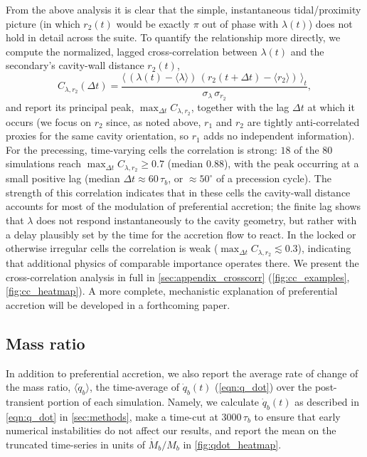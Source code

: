 \documentclass[fleqn,usenatbib]{mnras}
\begin{document}
From the above analysis it is clear that the simple, instantaneous tidal/proximity picture (in which $r_2(t)$ would be exactly $\pi$ out of phase with $\lambda(t)$) does not hold in detail across the suite. To quantify the relationship more directly, we compute the normalized, lagged cross-correlation between $\lambda(t)$ and the secondary's cavity-wall distance $r_2(t)$,
\begin{equation}\label{eqn:crosscorr}
    C_{\lambda, r_2}(\Delta t) = \frac{\big\langle \, (\lambda(t) - \langle\lambda\rangle)\,(r_2(t+\Delta t) - \langle r_2\rangle) \, \big\rangle_t}{\sigma_\lambda \, \sigma_{r_2}},
\end{equation}
and report its principal peak, $\max_{\Delta t} C_{\lambda, r_2}$, together with the lag $\Delta t$ at which it occurs (we focus on $r_2$ since, as noted above, $r_1$ and $r_2$ are tightly anti-correlated proxies for the same cavity orientation, so $r_1$ adds no independent information). For the precessing, time-varying cells the correlation is strong: $18$ of the $80$ simulations reach $\max_{\Delta t} C_{\lambda, r_2} \ge 0.7$ (median $0.88$), with the peak occurring at a small positive lag (median $\Delta t \approx 60\,\tau_b$, or $\approx 50^\circ$ of a precession cycle). The strength of this correlation indicates that in these cells the cavity-wall distance accounts for most of the modulation of preferential accretion; the finite lag shows that $\lambda$ does not respond instantaneously to the cavity geometry, but rather with a delay plausibly set by the time for the accretion flow to react. In the locked or otherwise irregular cells the correlation is weak ($\max_{\Delta t} C_{\lambda, r_2} \lesssim 0.3$), indicating that additional physics of comparable importance operates there. We present the cross-correlation analysis in full in \autoref{sec:appendix_crosscorr} (\autoref{fig:cc_examples}, \autoref{fig:cc_heatmap}). A more complete, mechanistic explanation of preferential accretion will be developed in a forthcoming paper.



\subsection{Mass ratio}\label{sec:mass_ratio}
In addition to preferential accretion, we also report the average rate of change of the mass ratio, $\langle \dot{q}_b \rangle$, the time-average of $\dot{q}_b(t)$ (\autoref{eqn:q_dot}) over the post-transient portion of each simulation. Namely, we calculate $\dot{q}_b(t)$ as described in \autoref{eqn:q_dot} in \autoref{sec:methods}, make a time-cut at $3000\,\tau_b$ to ensure that early numerical instabilities do not affect our results, and report the mean on the truncated time-series in units of $\dot{M}_b/M_b$ in \autoref{fig:qdot_heatmap}.
\end{document}
